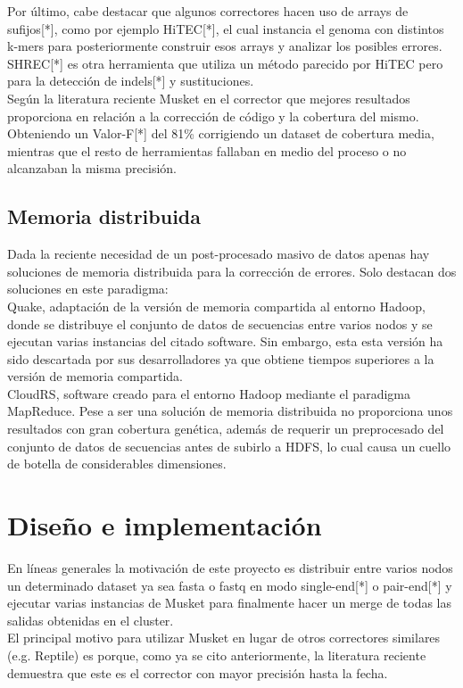 \documentclass[conference]{IEEEtran}
\begin{document}
Por último, cabe destacar que algunos correctores hacen uso de arrays de sufijos[*], como por ejemplo HiTEC[*], el cual instancia el genoma con distintos k-mers para posteriormente construir esos arrays y analizar los posibles errores. SHREC[*] es otra herramienta que utiliza un método parecido por HiTEC pero para la detección de indels[*] y sustituciones.\\

Según la literatura reciente\cite{comparative} Musket en el corrector que mejores resultados proporciona en relación a la corrección de código y la cobertura del mismo. Obteniendo un Valor-F[*] del 81\% corrigiendo un dataset de cobertura media, mientras que el resto de herramientas fallaban en medio del proceso o no alcanzaban la misma precisión.

\subsection{Memoria distribuida}
Dada la reciente necesidad de un post-procesado masivo de datos apenas hay soluciones de memoria distribuida para la corrección de errores. Solo destacan dos soluciones en este paradigma:\\

Quake, adaptación de la versión de memoria compartida al entorno Hadoop, donde se distribuye el conjunto de datos de secuencias entre varios nodos y se ejecutan varias instancias del citado software. Sin embargo, esta esta versión ha sido descartada por sus desarrolladores ya que obtiene tiempos superiores a la versión de memoria compartida.\\

CloudRS\cite{cloudrs}, software creado para el entorno Hadoop mediante el paradigma MapReduce. Pese a ser una solución de memoria distribuida no proporciona unos resultados con gran cobertura genética, además de requerir un preprocesado del conjunto de datos de secuencias antes de subirlo a HDFS, lo cual causa un cuello de botella de considerables dimensiones.\\

\section{Diseño e implementación}

En líneas generales la motivación de este proyecto es distribuir entre varios nodos un determinado dataset ya sea fasta o fastq en modo single-end[*] o pair-end[*] y ejecutar varias instancias de Musket para finalmente hacer un merge de todas las salidas obtenidas en el cluster.\\
El principal motivo para utilizar Musket en lugar de otros correctores similares (e.g. Reptile) es porque, como ya se cito anteriormente, la literatura reciente demuestra que este es el corrector con mayor precisión hasta la fecha.\\
\end{document}
